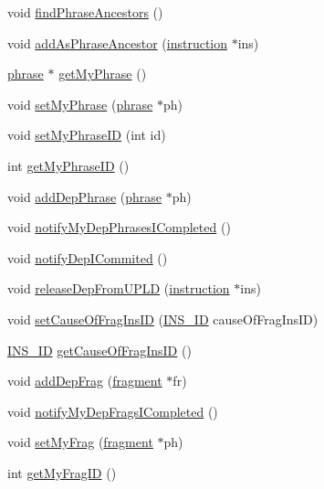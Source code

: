 \begin{DoxyCompactItemize}
\item 
void \hyperlink{classinstruction_aed4714151da7fbcbe65485e5699cd72c}{findPhraseAncestors} ()
\item 
void \hyperlink{classinstruction_a70d88f6c0d2cc47b2c18acd3118de671}{addAsPhraseAncestor} (\hyperlink{classinstruction}{instruction} $\ast$ins)
\item 
\hyperlink{classphrase}{phrase} $\ast$ \hyperlink{classinstruction_a127fdc66c20261ea6558b0167f19d5ea}{getMyPhrase} ()
\item 
void \hyperlink{classinstruction_aa2c3a45485ab0112df0187f08fd8a143}{setMyPhrase} (\hyperlink{classphrase}{phrase} $\ast$ph)
\item 
void \hyperlink{classinstruction_a9cf32c7fceaedc65fc68fc8711eef824}{setMyPhraseID} (int id)
\item 
int \hyperlink{classinstruction_a5047f83c94ed37bcae844d295ba0e6e4}{getMyPhraseID} ()
\item 
void \hyperlink{classinstruction_a5e29538d1a3dd4e92132212155dab21b}{addDepPhrase} (\hyperlink{classphrase}{phrase} $\ast$ph)
\item 
void \hyperlink{classinstruction_aa8c56a4a880638422bb8d1d1e5d24e8e}{notifyMyDepPhrasesICompleted} ()
\item 
void \hyperlink{classinstruction_a229c73b0e852f8b2ab3617b4bc4cb988}{notifyDepICommited} ()
\item 
void \hyperlink{classinstruction_a6fd66b22a3d589e5f366ec6addc62a3e}{releaseDepFromUPLD} (\hyperlink{classinstruction}{instruction} $\ast$ins)
\item 
void \hyperlink{classinstruction_a9006b031450e7290dc089f9edbc213c3}{setCauseOfFragInsID} (\hyperlink{global_2global_8h_a1883c47d0023d0f200e1d86eced6a070}{INS\_\-ID} causeOfFragInsID)
\item 
\hyperlink{global_2global_8h_a1883c47d0023d0f200e1d86eced6a070}{INS\_\-ID} \hyperlink{classinstruction_a547b08ed7230d48cdc4f2eb5561acac8}{getCauseOfFragInsID} ()
\item 
void \hyperlink{classinstruction_a9d82ae4388d743b3fecea8c3cded36f4}{addDepFrag} (\hyperlink{classfragment}{fragment} $\ast$fr)
\item 
void \hyperlink{classinstruction_a9ece958dee811e62fc0bf63d35bd88d8}{notifyMyDepFragsICompleted} ()
\item 
void \hyperlink{classinstruction_a8fb8324e5524fb201e1377ad3e8e2c3b}{setMyFrag} (\hyperlink{classfragment}{fragment} $\ast$ph)
\item 
int \hyperlink{classinstruction_aab5d4a97c106ad3a04bca6dc2ff8e11c}{getMyFragID} ()

\end{DoxyCompactItemize}
